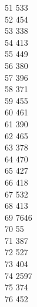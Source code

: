 { 51	533 \\
 52	454 \\
 53	338 \\
 54	413 \\
 55	449 \\
 56	380 \\
 57	396 \\
 58	371 \\
 59	455 \\
 60	461 \\
 61	390 \\
 62	465 \\
 63	378 \\
 64	470 \\
 65	427 \\
 66	418 \\
 67	532 \\
 68	413 \\
 69	7646 \\
 70	55 \\
 71	387 \\
 72	527 \\
 73	404 \\
 74	2597 \\
 75	374 \\
 76	452 \\
}
